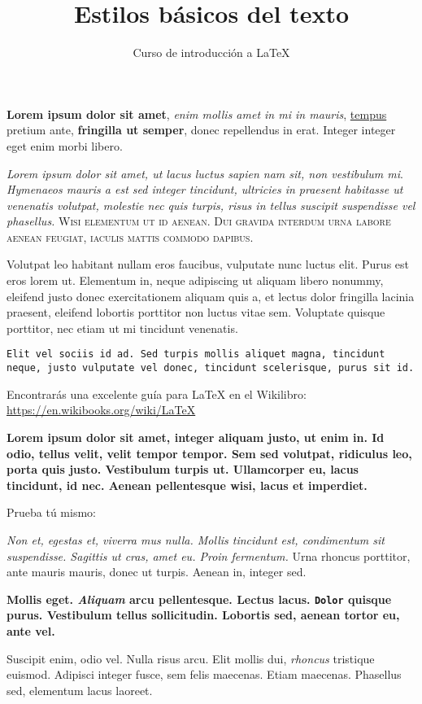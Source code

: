 \documentclass[10pt,letterpaper]{article}
\title{Estilos básicos del texto}
\author{Curso de introducción a LaTeX}
\begin{document}
\maketitle
\textbf{Lorem ipsum dolor sit amet}, \textit{enim mollis amet in mi in mauris}, \underline{tempus} pretium ante, \textbf{fringilla ut semper}, donec repellendus in erat. Integer integer eget enim morbi libero.
 
\emph{Lorem ipsum dolor sit amet, ut lacus luctus sapien nam sit, non vestibulum mi}. \textsl{Hymenaeos mauris a est sed integer tincidunt, ultricies in praesent habitasse ut venenatis volutpat, molestie nec quis turpis, risus in tellus suscipit suspendisse vel phasellus.} \textsc{Wisi elementum ut id aenean. Dui gravida interdum urna labore aenean feugiat, iaculis mattis commodo dapibus}.
 
\textsf{Volutpat leo habitant nullam eros faucibus, vulputate nunc luctus elit. Purus est eros lorem ut. Elementum in, neque adipiscing ut aliquam libero nonummy, eleifend justo donec exercitationem aliquam quis a, et lectus dolor fringilla lacinia praesent, eleifend lobortis porttitor non luctus vitae sem. Voluptate quisque porttitor, nec etiam ut mi tincidunt venenatis.}
 
\texttt{Elit vel sociis id ad. Sed turpis mollis aliquet magna, tincidunt neque, justo vulputate vel donec, tincidunt scelerisque, purus sit id.}
 
Encontrarás una excelente guía para LaTeX en el Wikilibro: \url{https://en.wikibooks.org/wiki/LaTeX}

{\bfseries Lorem ipsum dolor sit amet, integer aliquam justo, ut enim in. Id odio, tellus velit, velit tempor tempor. Sem sed volutpat, ridiculus leo, porta quis justo. Vestibulum turpis ut. Ullamcorper eu, lacus tincidunt, id nec. Aenean pellentesque wisi, lacus et imperdiet.}

Prueba tú mismo:

\textit{Non et, egestas et, viverra mus nulla. \emph{Mollis tincidunt est}, condimentum sit suspendisse. Sagittis ut cras, amet eu. Proin fermentum.} Urna rhoncus porttitor, ante mauris mauris, donec ut turpis. Aenean in, integer sed.
 
\textbf{Mollis eget. \emph{Aliquam} arcu pellentesque. Lectus lacus. \texttt{Dolor} quisque purus. Vestibulum tellus sollicitudin. Lobortis sed, aenean tortor eu, ante vel.}
 
Suscipit enim, odio vel. Nulla risus arcu. Elit mollis dui, \textsl{rhoncus} tristique euismod. Adipisci integer fusce, sem felis maecenas. Etiam maecenas. Phasellus sed, elementum lacus laoreet.
\end{document}

